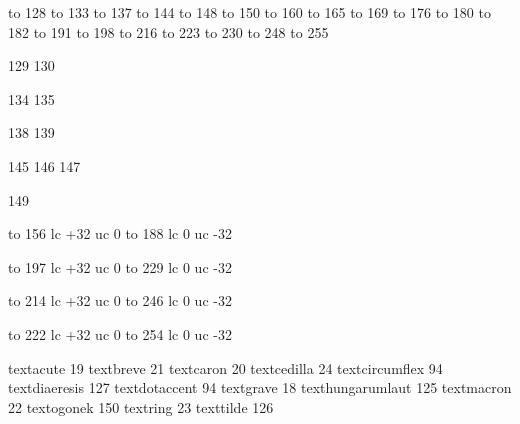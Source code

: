 


\startmapping[qx] %

 to 128
 to 133
 to 137
 to 144
 to 148
 to 150
 to 160
 to 165
 to 169
 to 176
 to 180
 to 182
 to 191
 to 198
 to 216
 to 223
 to 230
 to 248
 to 255

 129
 130

 134
 135

 138
 139

 145
 146
 147

 149

 to 156 lc +32 uc   0
 to 188 lc   0 uc -32

 to 197 lc +32 uc   0
 to 229 lc   0 uc -32

 to 214 lc +32 uc   0
 to 246 lc   0 uc -32

 to 222 lc +32 uc   0
 to 254 lc   0 uc -32

\stopmapping

\startencoding[qx]

 textacute         19
 textbreve         21
 textcaron         20
 textcedilla       24
 textcircumflex    94
 textdiaeresis    127
 textdotaccent     94
 textgrave         18
 texthungarumlaut 125
 textmacron        22
 textogonek       150
 textring          23
 texttilde        126

